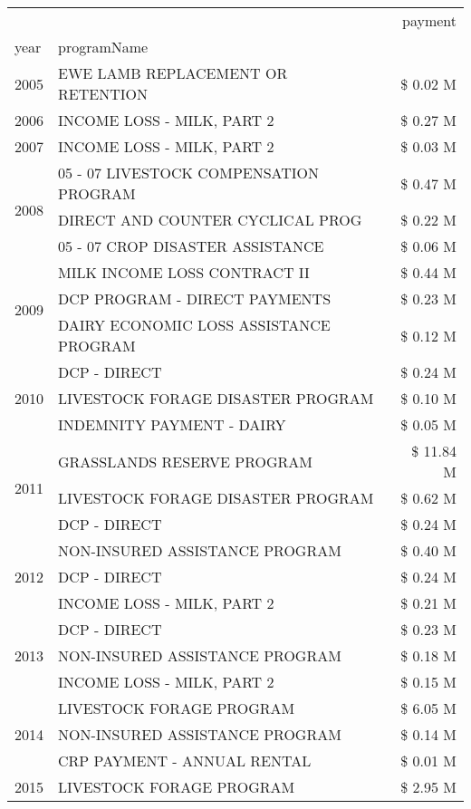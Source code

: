 \begin{tabular}{llr}
\toprule
 &  & payment \\
year & programName &  \\
\midrule
2005 & EWE LAMB REPLACEMENT OR RETENTION & \$ 0.02 M \\
\cline{1-3}
2006 & INCOME LOSS - MILK, PART 2 & \$ 0.27 M \\
\cline{1-3}
2007 & INCOME LOSS - MILK, PART 2 & \$ 0.03 M \\
\cline{1-3}
\multirow[t]{3}{*}{2008} & 05 - 07 LIVESTOCK COMPENSATION PROGRAM & \$ 0.47 M \\
 & DIRECT AND COUNTER CYCLICAL PROG & \$ 0.22 M \\
 & 05 - 07 CROP DISASTER ASSISTANCE & \$ 0.06 M \\
\cline{1-3}
\multirow[t]{3}{*}{2009} & MILK INCOME LOSS CONTRACT II & \$ 0.44 M \\
 & DCP PROGRAM - DIRECT PAYMENTS & \$ 0.23 M \\
 & DAIRY ECONOMIC LOSS ASSISTANCE PROGRAM & \$ 0.12 M \\
\cline{1-3}
\multirow[t]{3}{*}{2010} & DCP - DIRECT & \$ 0.24 M \\
 & LIVESTOCK FORAGE DISASTER PROGRAM & \$ 0.10 M \\
 & INDEMNITY PAYMENT - DAIRY & \$ 0.05 M \\
\cline{1-3}
\multirow[t]{3}{*}{2011} & GRASSLANDS RESERVE PROGRAM & \$ 11.84 M \\
 & LIVESTOCK FORAGE DISASTER PROGRAM & \$ 0.62 M \\
 & DCP - DIRECT & \$ 0.24 M \\
\cline{1-3}
\multirow[t]{3}{*}{2012} & NON-INSURED ASSISTANCE PROGRAM & \$ 0.40 M \\
 & DCP - DIRECT & \$ 0.24 M \\
 & INCOME LOSS - MILK, PART 2 & \$ 0.21 M \\
\cline{1-3}
\multirow[t]{3}{*}{2013} & DCP - DIRECT & \$ 0.23 M \\
 & NON-INSURED ASSISTANCE PROGRAM & \$ 0.18 M \\
 & INCOME LOSS - MILK, PART 2 & \$ 0.15 M \\
\cline{1-3}
\multirow[t]{3}{*}{2014} & LIVESTOCK FORAGE PROGRAM & \$ 6.05 M \\
 & NON-INSURED ASSISTANCE PROGRAM & \$ 0.14 M \\
 & CRP PAYMENT - ANNUAL RENTAL & \$ 0.01 M \\
\cline{1-3}
\multirow[t]{3}{*}{2015} & LIVESTOCK FORAGE PROGRAM & \$ 2.95 M \\

\end{tabular}
